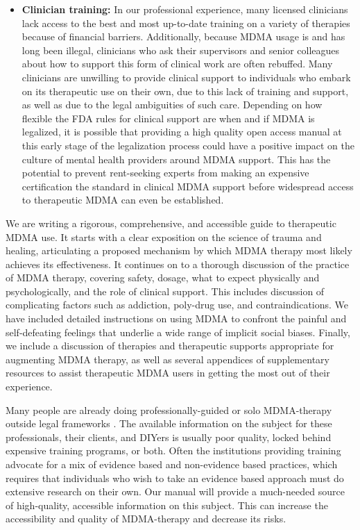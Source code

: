 \documentclass[12pt,letterpaper]{book}
\begin{document}
\begin{itemize}
    \item \textbf{Clinician training:} In our professional experience, many licensed clinicians lack access to the best and most up-to-date training on a variety of therapies because of financial barriers. Additionally, because MDMA usage is and has long been illegal, clinicians who ask their supervisors and senior colleagues about how to support this form of clinical work are often rebuffed. Many clinicians are unwilling to provide clinical support to individuals who embark on its therapeutic use on their own, due to this lack of training and support, as well as due to the legal ambiguities of such care. Depending on how flexible the FDA rules for clinical support are when and if MDMA is legalized, it is possible that providing a high quality open access manual at this early stage of the legalization process could have a positive impact on the culture of mental health providers around MDMA support. This has the potential to prevent rent-seeking experts from making an expensive certification the standard in clinical MDMA support before widespread access to therapeutic MDMA can even be established.
\end{itemize}

We are writing a rigorous, comprehensive, and accessible guide to therapeutic MDMA use. It starts with a clear exposition on the science of trauma and healing, articulating a proposed mechanism by which MDMA therapy most likely achieves its effectiveness. It continues on to a thorough discussion of the practice of MDMA therapy, covering safety, dosage, what to expect physically and psychologically, and the role of clinical support. This includes discussion of complicating factors such as addiction, poly-drug use, and contraindications. We have included detailed instructions on using MDMA to confront the painful and self-defeating feelings that underlie a wide range of implicit social biases. Finally, we include a discussion of therapies and therapeutic supports appropriate for augmenting MDMA therapy, as well as several appendices of supplementary resources to assist therapeutic MDMA users in getting the most out of their experience.

Many people are already doing professionally-guided or solo MDMA-therapy outside legal frameworks \cite{hillsSolo,passieHistory}. The available information on the subject for these professionals, their clients, and DIYers is usually poor quality, locked behind expensive training programs, or both. Often the institutions providing training advocate for a mix of evidence based and non-evidence based practices, which requires that individuals who wish to take an evidence based approach must do extensive research on their own. Our manual will provide a much-needed source of high-quality, accessible information on this subject. This can increase the accessibility and quality of MDMA-therapy and decrease its risks.
\end{document}
